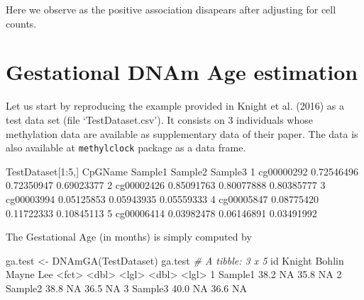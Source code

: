 \documentclass[]{article}
\newcommand{\hlnum}[1]{\textcolor[rgb]{0.816,0.125,0.439}{#1}}%
\newcommand{\hlstr}[1]{\textcolor[rgb]{0.251,0.627,0.251}{#1}}%
\newcommand{\hlcom}[1]{\textcolor[rgb]{0.502,0.502,0.502}{\textit{#1}}}%
\newcommand{\hlopt}[1]{\textcolor[rgb]{0,0,0}{#1}}%
\newcommand{\hlstd}[1]{\textcolor[rgb]{0.251,0.251,0.251}{#1}}%
\newcommand{\hlkwd}[1]{\textcolor[rgb]{0.878,0.439,0.125}{#1}}%
\newenvironment{Shaded}{\begin{myshaded}}{\end{myshaded}}
\newcommand{\KeywordTok}[1]{\hlkwd{#1}}
\newcommand{\DecValTok}[1]{\hlnum{#1}}
\newcommand{\FloatTok}[1]{\hlnum{#1}}
\newcommand{\StringTok}[1]{\hlstr{#1}}
\newcommand{\CommentTok}[1]{\hlcom{#1}}
\newcommand{\OtherTok}[1]{{#1}}
\newcommand{\OperatorTok}[1]{\hlopt{#1}}
\newcommand{\ErrorTok}[1]{\textcolor{errorcolor}{#1}}
\newcommand{\NormalTok}[1]{\hlstd{#1}}
\begin{document}
Here we observe as the positive association disapears after adjusting for cell counts.

\hypertarget{gestational-dnam-age-estimation}{%
\section{Gestational DNAm Age estimation}\label{gestational-dnam-age-estimation}}

Let us start by reproducing the example provided in Knight et al. (2016) as a test data set (file `TestDataset.csv'). It consists on 3 individuals whose methylation data are available as supplementary data of their paper. The data is also available at \texttt{methylclock} package as a data frame.

\begin{Shaded}
\begin{Highlighting}[]
\NormalTok{TestDataset[}\DecValTok{1}\OperatorTok{:}\DecValTok{5}\NormalTok{,]}
\NormalTok{       CpGName    Sample1    Sample2    Sample3}
  \DecValTok{1}\NormalTok{ cg00000292 }\FloatTok{0.72546496} \FloatTok{0.72350947} \FloatTok{0.69023377}
  \DecValTok{2}\NormalTok{ cg00002426 }\FloatTok{0.85091763} \FloatTok{0.80077888} \FloatTok{0.80385777}
  \DecValTok{3}\NormalTok{ cg00003994 }\FloatTok{0.05125853} \FloatTok{0.05943935} \FloatTok{0.05559333}
  \DecValTok{4}\NormalTok{ cg00005847 }\FloatTok{0.08775420} \FloatTok{0.11722333} \FloatTok{0.10845113}
  \DecValTok{5}\NormalTok{ cg00006414 }\FloatTok{0.03982478} \FloatTok{0.06146891} \FloatTok{0.03491992}
\end{Highlighting}
\end{Shaded}

The Gestational Age (in months) is simply computed by

\begin{Shaded}
\begin{Highlighting}[]
\NormalTok{ga.test <-}\StringTok{ }\KeywordTok{DNAmGA}\NormalTok{(TestDataset)}
\NormalTok{ga.test}
  \CommentTok{# A tibble: 3 x 5}
\NormalTok{    id      Knight Bohlin Mayne Lee  }
    \OperatorTok{<}\NormalTok{fct}\OperatorTok{>}\StringTok{    }\ErrorTok{<}\NormalTok{dbl}\OperatorTok{>}\StringTok{ }\ErrorTok{<}\NormalTok{lgl}\OperatorTok{>}\StringTok{  }\ErrorTok{<}\NormalTok{dbl}\OperatorTok{>}\StringTok{ }\ErrorTok{<}\NormalTok{lgl}\OperatorTok{>}
\StringTok{  }\DecValTok{1}\NormalTok{ Sample1   }\FloatTok{38.2} \OtherTok{NA}      \FloatTok{35.8} \OtherTok{NA}   
  \DecValTok{2}\NormalTok{ Sample2   }\FloatTok{38.8} \OtherTok{NA}      \FloatTok{36.5} \OtherTok{NA}   
  \DecValTok{3}\NormalTok{ Sample3   }\FloatTok{40.0} \OtherTok{NA}      \FloatTok{36.6} \OtherTok{NA}
\end{Highlighting}
\end{Shaded}
\end{document}
